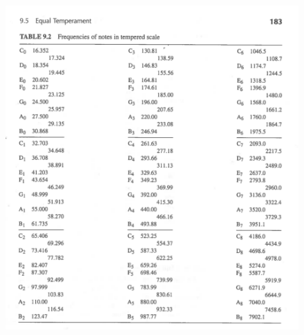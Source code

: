 \documentclass{article}
\begin{document}
\begin{figure}[H]
    \centering
    \includegraphics[scale=1.3]{figures/oving9_3.png}
    \label{fig:3}
\end{figure}
\end{document}
